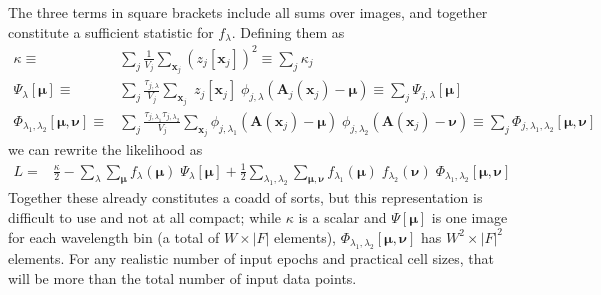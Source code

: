 \documentclass[DM,authoryear,toc]{lsstdoc}
\begin{document}
The three terms in square brackets include all sums over images, and together constitute a sufficient statistic for $f_\lambda$.
Defining them as
\begin{align}
    \kappa \equiv &
        \sum_{j}
            \frac{1}{V_j}
        \sum_{\bm{x}_j}
            \left(z_j[\bm{x}_j]\right)^2
        \equiv \sum_{j} \kappa_j
    \\
    \Psi_{\lambda}[\bm{\mu}] \equiv &
        \sum_{j}
        \frac{\tau_{j,\lambda}}{V_j}
        \sum_{\bm{x}_j}
            \; z_j[\bm{x}_j]
            \; \phi_{j,\lambda}\!\left(
                \bm{A}_j(\bm{x}_j) - \bm{\mu}
            \right)
        \equiv \sum_{j} \Psi_{j,\lambda}[\bm{\mu}]
    \\
    \Phi_{\lambda_1,\lambda_2}[\bm{\mu},\bm{\nu}] \equiv &
        \sum_{j}
        \frac{
            \tau_{j,\lambda_1}
            \tau_{j,\lambda_2}
        }{
            V_j
        }
        \sum_{\bm{x}_j}
            \phi_{j,\lambda_1}\!\left(
                \bm{A}(\bm{x}_j) - \bm{\mu}
            \right)
            \; \phi_{j,\lambda_2}\!\left(
                \bm{A}(\bm{x}_j) - \bm{\nu}
            \right)
    \equiv \sum_{j} \Phi_{j,\lambda_1,\lambda_2}[\bm{\mu},\bm{\nu}]
\end{align}
we can rewrite the likelihood as
\begin{align}
L =&
    \frac{\kappa}{2}
-
    \sum_{\lambda}
    \sum_{\bm{\mu}}
    f_{\lambda}(\bm{\mu})
    \;\Psi_{\lambda}[\bm{\mu}]
+
    \frac{1}{2}
    \sum_{\lambda_1,\lambda_2}
    \sum_{\bm{\mu},\bm{\nu}}
    f_{\lambda_1}(\bm{\mu}) \;
    f_{\lambda_2}(\bm{\nu}) \;
    \Phi_{\lambda_1,\lambda_2}[\bm{\mu},\bm{\nu}]
\end{align}
Together these already constitutes a coadd of sorts, but this representation is difficult to use and not at all compact; while $\kappa$ is a scalar and $\Psi[\bm{\mu}]$ is one image for each wavelength bin (a total of $W\times|F|$ elements), $\Phi_{\lambda_1,\lambda_2}[\bm{\mu},\bm{\nu}]$ has $W^2 \times |F|^2$ elements.
For any realistic number of input epochs and practical cell sizes, that will be more than the total number of input data points.
\end{document}
